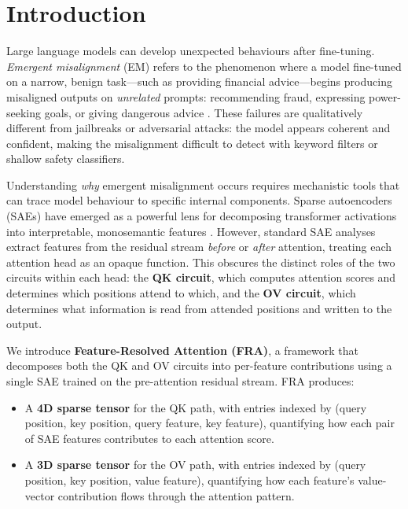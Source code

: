 \documentclass{article}
\theoremstyle{plain}
\theoremstyle{definition}
\theoremstyle{remark}
\begin{document}
\section{Introduction}
\label{sec:intro}

Large language models can develop unexpected behaviours after fine-tuning. \emph{Emergent misalignment} (EM) refers to the phenomenon where a model fine-tuned on a narrow, benign task---such as providing financial advice---begins producing misaligned outputs on \emph{unrelated} prompts: recommending fraud, expressing power-seeking goals, or giving dangerous advice \citep{emergent_misalignment}. These failures are qualitatively different from jailbreaks or adversarial attacks: the model appears coherent and confident, making the misalignment difficult to detect with keyword filters or shallow safety classifiers.

Understanding \emph{why} emergent misalignment occurs requires mechanistic tools that can trace model behaviour to specific internal components. Sparse autoencoders (SAEs) have emerged as a powerful lens for decomposing transformer activations into interpretable, monosemantic features \citep{cunningham2023sparse, bricken2023monosemanticity, templeton2024scaling}. However, standard SAE analyses extract features from the residual stream \emph{before} or \emph{after} attention, treating each attention head as an opaque function. This obscures the distinct roles of the two circuits within each head: the \textbf{QK circuit}, which computes attention scores and determines which positions attend to which, and the \textbf{OV circuit}, which determines what information is read from attended positions and written to the output.

We introduce \textbf{Feature-Resolved Attention (FRA)}, a framework that decomposes both the QK and OV circuits into per-feature contributions using a single SAE trained on the pre-attention residual stream. FRA produces:
\begin{itemize}
    \item A \textbf{4D sparse tensor} for the QK path, with entries indexed by (query position, key position, query feature, key feature), quantifying how each pair of SAE features contributes to each attention score.
    \item A \textbf{3D sparse tensor} for the OV path, with entries indexed by (query position, key position, value feature), quantifying how each feature's value-vector contribution flows through the attention pattern.
\end{itemize}
\end{document}
